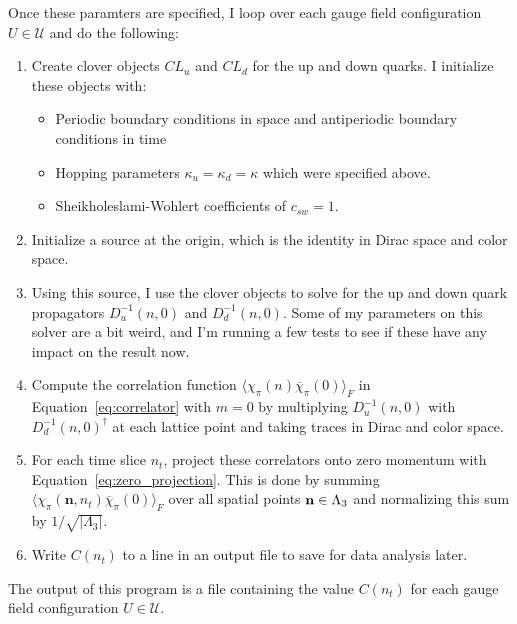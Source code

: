 \documentclass[11pt, oneside]{article}   	%
\theoremstyle{definition}
\begin{document}
Once these paramters are specified, I loop over each gauge field configuration $U\in\mathcal U$ and do the following:
\begin{enumerate}
	\item Create clover objects $CL_u$ and $CL_d$ for the up and down quarks. I initialize these objects with:
	\begin{itemize}
    		\item Periodic boundary conditions in space and antiperiodic boundary conditions in time
		\item Hopping parameters $\kappa_u = \kappa_d = \kappa$ which were specified above. 
		\item Sheikholeslami-Wohlert coefficients of $c_{sw} = 1$. 
	\end{itemize}
	\item Initialize a source at the origin, which is the identity in Dirac space and color space. 
	\item Using this source, I use the clover objects to solve for the up and down quark propagators $D^{-1}_u(n, 0)$ 
	and $D^{-1}_d(n, 0)$. Some of my parameters on this solver are a bit weird, and I'm running a few tests to see if 
	these have any impact on the result now.
	\item Compute the correlation function $\langle\chi_\pi(n)\overline\chi_\pi(0)\rangle_F$ in 
	Equation~\ref{eq:correlator} with $m = 0$ by multiplying $D^{-1}_u(n, 0)$ with $D^{-1}_d(n, 0)^\dagger$ at each 
	lattice point and taking traces in Dirac and color space. 
	\item For each time slice $n_t$, project these correlators onto zero momentum with 
	Equation~\ref{eq:zero_projection}. This is done by summing 
	$\langle\chi_\pi (\mathbf n, n_t)\overline\chi_\pi (0)\rangle_F$ over all spatial points $\textbf n\in\Lambda_3$ and 
	normalizing this sum by $1 / \sqrt{|\Lambda_3|}$. 
	\item Write $C(n_t)$ to a line in an output file to save for data analysis later. 
\end{enumerate}

The output of this program is a file containing the value $C(n_t)$ for each gauge field configuration $U\in\mathcal U$. 
\end{document}
